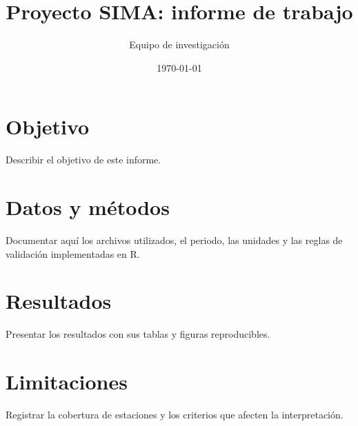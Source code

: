 \documentclass[12pt,a4paper]{article}
\title{Proyecto SIMA: informe de trabajo}
\author{Equipo de investigación}
\date{\today}
\begin{document}
\maketitle

\section{Objetivo}
Describir el objetivo de este informe.

\section{Datos y métodos}
Documentar aquí los archivos utilizados, el periodo, las unidades y las reglas de validación implementadas en R.

\section{Resultados}
Presentar los resultados con sus tablas y figuras reproducibles.

\section{Limitaciones}
Registrar la cobertura de estaciones y los criterios que afecten la interpretación.
\end{document}
